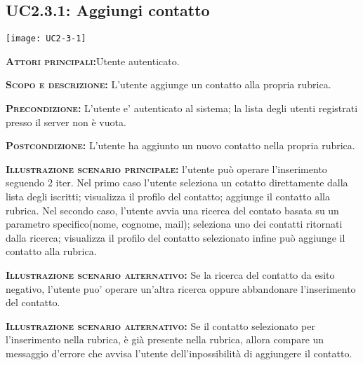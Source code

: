 \subsection{UC2.3.1: Aggiungi contatto}
\begin{center}
\texttt{[image: UC2-3-1]}
\end{center}
\begin{description}
\item{\scshape\bfseries Attori principali:}Utente autenticato.
\item{\scshape\bfseries Scopo e descrizione:} L'utente aggiunge un contatto alla propria rubrica.
\item{\scshape\bfseries Precondizione:} L'utente e' autenticato al sistema; la lista degli utenti registrati presso il server non è vuota.
\item{\scshape\bfseries Postcondizione:} L'utente ha aggiunto un nuovo contatto nella propria rubrica.
\item{\scshape\bfseries Illustrazione scenario principale:} l'utente può operare l'inserimento seguendo 2 iter. Nel primo caso l'utente seleziona un cotatto direttamente dalla lista degli iscritti; visualizza il profilo del contatto; aggiunge il contatto alla rubrica. Nel secondo caso, l'utente avvia una ricerca del contato basata su un parametro specifico(nome, cognome, mail); seleziona uno dei contatti ritornati dalla ricerca; visualizza il profilo del contatto selezionato infine può aggiunge il contatto alla rubrica.
\item{\scshape\bfseries Illustrazione scenario alternativo:} Se la ricerca del contatto da esito negativo, l'utente puo' operare un'altra ricerca oppure abbandonare l'inserimento del contatto.
\item{\scshape\bfseries Illustrazione scenario alternativo:} Se il contatto selezionato per l'inserimento nella rubrica, è già presente nella rubrica, allora compare un messaggio d'errore che avvisa l'utente dell'inpossibilità di aggiungere il contatto.
\end{description}

